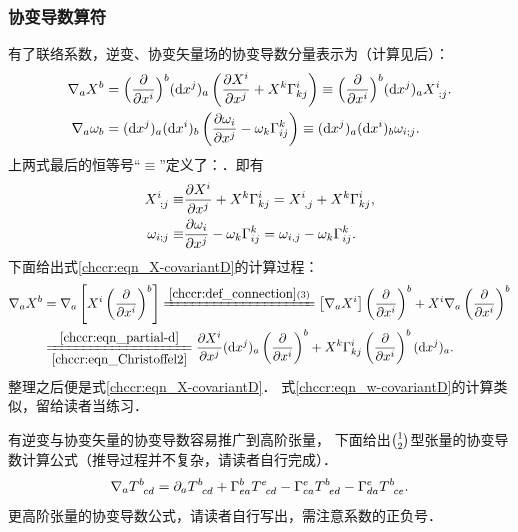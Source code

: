 \subsubsection{协变导数算符}
有了联络系数，逆变、协变矢量场的协变导数分量表示为（计算见后）：
\begin{align}
    \nabla_a X^b & = \Bigl(\frac{\partial}{\partial x^i}\Bigr)^b ({\rm d}x^j)_a
    \left(\frac{\partial X^i}{\partial x^j} +X^k \Gamma_{kj}^i \right)
    \equiv \Bigl(\frac{\partial}{\partial x^i}\Bigr)^b ({\rm d}x^j)_a  X^i_{\hphantom{i};j}  .
    \label{chccr:eqn_X-covariantD} \\
    \nabla_a \omega_b & = ({\rm d}x^j)_a  ({\rm d}x^i)_b \left(\frac{\partial \omega_i}{\partial x^j}
    -\omega_k \Gamma_{ij}^k \right) \equiv({\rm d}x^j)_a  ({\rm d}x^i)_b  \omega_{i;j} .
    \label{chccr:eqn_w-covariantD}
\end{align}
上两式最后的恒等号“$\equiv$”定义了：．即有
\begin{align}
    X^i_{\hphantom{i};j} \equiv& \frac{\partial X^i}{\partial x^j} +X^k \Gamma_{kj}^i
       =X^i_{\hphantom{i}, j} +X^k \Gamma_{kj}^i, \\
    \omega_{i;j} \equiv& \frac{\partial \omega_i}{\partial x^j} -\omega_k \Gamma_{ij}^k
       =\omega_{i,j} -\omega_k \Gamma_{ij}^k .
\end{align}
下面给出式\eqref{chccr:eqn_X-covariantD}的计算过程：
\begin{align*}
    \nabla_a X^b & = \nabla_a \left[X^i \left(\frac{\partial }{\partial x^i}\right) ^b \right]
    \xlongequal{\ref{chccr:def_connection} (3)}
    \left[\nabla_a X^i\right] \left(\frac{\partial }{\partial x^i}\right) ^b
      +X^i \nabla_a \left(\frac{\partial }{\partial x^i}\right) ^b \\
    & \xlongequal[\ref{chccr:eqn_Christoffel2}]{\ref{chccr:eqn_partial-d}}
    \frac{\partial X^i}{\partial x^j}({\rm d}x^j)_a \left(\frac{\partial }{\partial x^i}\right) ^b
      +X^k \Gamma^{i}_{kj} \left(\frac{\partial }{\partial x^i}\right) ^b ({\rm d} x^j)_a  .
\end{align*}
整理之后便是式\eqref{chccr:eqn_X-covariantD}．
式\eqref{chccr:eqn_w-covariantD}的计算类似，留给读者当练习．

有逆变与协变矢量的协变导数容易推广到高阶张量，
下面给出$\binom{1}{2}$型张量的协变导数计算公式（推导过程并不复杂，请读者自行完成）．
\begin{equation}\label{chccr:eqn_T-covariantD}
    \nabla_a T^b_{\hphantom{a} cd} = \partial_a T^b_{\hphantom{a} cd} + \Gamma^b_{ea} T^e_{\hphantom{a}  cd}
     -\Gamma^e_{ca} T^b_{\hphantom{a} ed} -\Gamma^e_{da} T^b_{\hphantom{a} ce} .
\end{equation}
更高阶张量的协变导数公式，请读者自行写出，需注意系数的正负号．

